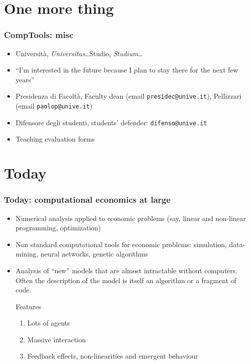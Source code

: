 \documentclass[handout,a4paper]{beamer} 			%
\begin{document}
\section{One more thing}
\begin{frame}
    \frametitle{CompTools: misc} 
    \begin{itemize}
	\item Universit\`a, \emph{Universitas}\ldots Studio,
	\emph{Studium}\ldots
	
	\item ``I'm interested in the future because I plan to stay
	there for the next few years''

	\item Presidenza di Facolt\`a, Faculty dean (email \texttt{presidec@unive.it}),
	Pellizzari (email \texttt{paolop@unive.it})

	\item Difensore degli studenti, students' defender:
	\texttt{difenso@unive.it}\\
	
	\item Teaching evaluation forms
\end{itemize}
\end{frame}

\section{Today}
\begin{frame}
    \frametitle{Today: computational economics at large} 
    \begin{itemize}
	\item Numerical analysis applied to economic problems (say,
	linear and non-linear programming, optimization)
	
	\item Non standard computational tools for economic problems:
	simulation, data-mining, neural networks, genetic algorithms
	
	\item Analysis of ``new'' models that are almost intractable
	without computers.  Often the description of the model is
	itself an algorithm or a fragment of code.
	
	\begin{block}{Features}
	    \begin{enumerate}
	        \item Lots of agents
	    
	        \item Massive interaction
	    
	        \item Feedback effects, non-linearities and emergent 
		behaviour
	    \end{enumerate}
       \end{block}	    

    \end{itemize}
\end{frame}
\end{document}
